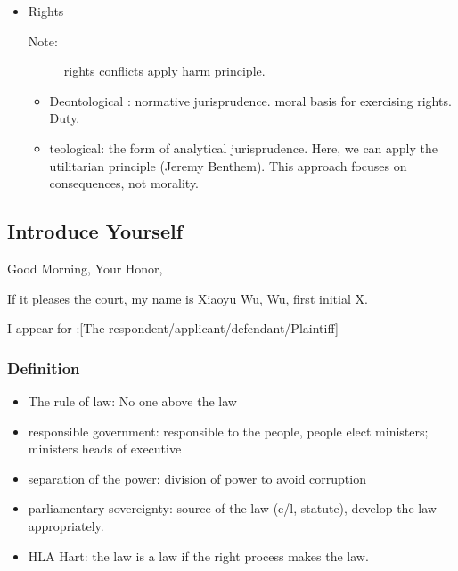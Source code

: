 \begin{itemize}
\begin{itemize}
            \item Rights
                 \begin{description}
                    \item[Note:] rights conflicts apply harm principle. 
                \end{description}

                \begin{itemize}
                    \item Deontological : normative jurisprudence. moral basis for exercising rights. Duty. 
                    \item teological: the form of analytical jurisprudence. Here, we can apply the utilitarian principle (Jeremy Benthem). This approach focuses on consequences, not morality. 
                \end{itemize}

        \end{itemize}
    
\end{itemize}



\subsection*{Introduce Yourself}
Good Morning, Your Honor,

If it pleases the court, my name is   Xiaoyu Wu, Wu, first initial X. 

I appear for :[The respondent/applicant/defendant/Plaintiff]

\subsubsection*{Definition}
\begin{itemize}
    \item The rule of law: No one above the law
    \item responsible government: responsible to the people, people elect ministers; ministers heads of executive
    \item separation of the power: division of power to avoid corruption
    \item parliamentary sovereignty: source of the law (c/l, statute), develop the law appropriately. 
    \item HLA Hart: the law is a law if the right process makes the law. 
    
\end{itemize}


